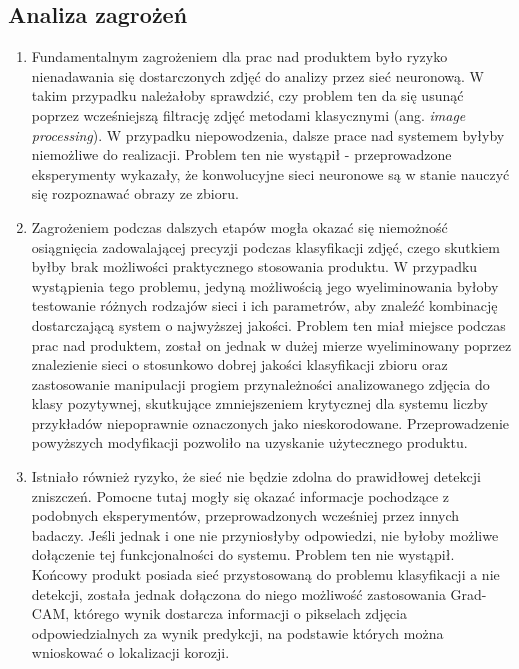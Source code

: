 \documentclass[polish,12pt]{aghthesis}
\begin{document}
\subsection{Analiza zagrożeń}
\begin{enumerate}
    \item Fundamentalnym zagrożeniem dla prac nad produktem było ryzyko nienadawania się dostarczonych zdjęć do analizy przez sieć neuronową. W takim przypadku należałoby sprawdzić, czy problem ten da się usunąć poprzez wcześniejszą filtrację zdjęć metodami klasycznymi (ang. \textit{image processing}). W przypadku niepowodzenia, dalsze prace nad systemem byłyby niemożliwe do realizacji.
    \newline Problem ten nie wystąpił - przeprowadzone eksperymenty wykazały, że konwolucyjne sieci neuronowe są w stanie nauczyć się rozpoznawać obrazy ze zbioru. 
    \item Zagrożeniem podczas dalszych etapów mogła okazać się niemożność osiągnięcia zadowalającej precyzji podczas klasyfikacji zdjęć, czego skutkiem byłby brak możliwości praktycznego stosowania produktu. W przypadku wystąpienia tego problemu, jedyną możliwością jego wyeliminowania byłoby testowanie różnych rodzajów sieci i ich parametrów, aby znaleźć kombinację dostarczającą system o najwyższej jakości.
    \newline Problem ten miał miejsce podczas prac nad produktem, został on jednak w dużej mierze wyeliminowany poprzez znalezienie sieci o stosunkowo dobrej jakości klasyfikacji zbioru oraz zastosowanie manipulacji progiem przynależności analizowanego zdjęcia do klasy pozytywnej, skutkujące zmniejszeniem krytycznej dla systemu liczby przykładów niepoprawnie oznaczonych jako nieskorodowane. Przeprowadzenie powyższych modyfikacji pozwoliło na uzyskanie użytecznego produktu.
    \item Istniało również ryzyko, że sieć nie będzie zdolna do prawidłowej detekcji zniszczeń. Pomocne tutaj mogły się okazać informacje pochodzące z podobnych eksperymentów, przeprowadzonych wcześniej przez innych badaczy. Jeśli jednak i one nie przyniosłyby odpowiedzi, nie byłoby możliwe dołączenie tej funkcjonalności do systemu. 
    \newline Problem ten nie wystąpił. Końcowy produkt posiada sieć przystosowaną do problemu klasyfikacji a nie detekcji, została jednak dołączona do niego możliwość zastosowania Grad-CAM, którego wynik dostarcza informacji o pikselach zdjęcia odpowiedzialnych za wynik predykcji, na podstawie których można wnioskować o lokalizacji korozji.

\end{enumerate}
\end{document}
